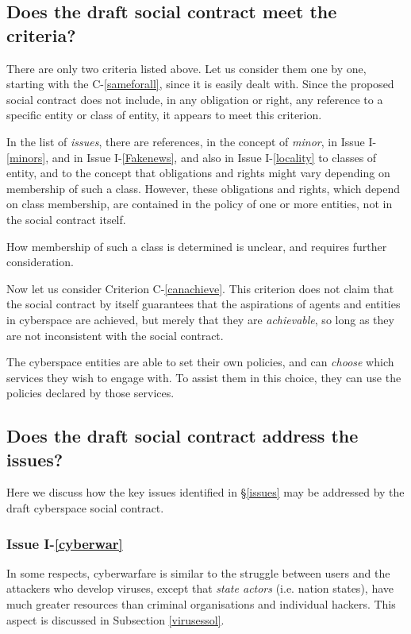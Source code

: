 \subsection{Does the draft social contract meet the criteria?}

There are only two criteria listed above. Let us consider them one by one, starting
with the C-\ref{sameforall}, since it is easily dealt with. Since the proposed social
contract does not include, in any obligation or right, any reference to a specific
entity or class of entity, it appears to meet this criterion.

In the list of {\em issues}, there are references,
in the concept of {\em minor}, in Issue I-\ref{minors}, and in Issue
I-\ref{Fakenews}, and also in Issue I-\ref{locality} to classes of entity, 
and to the concept that obligations and rights might vary depending on membership of such a class.
However, these obligations and rights, which depend on class membership, are contained
in the policy of one or more entities, not in the social contract itself.

How membership of such a class is determined is unclear, and requires further consideration.

Now let us consider Criterion C-\ref{canachieve}. This criterion does not claim that
the social contract by itself guarantees that the aspirations of agents
and entities in cyberspace are achieved, but merely that they are {\em achievable},
so long as they are not inconsistent with the social contract.

The cyberspace entities are able to set their own policies, and can {\em choose}
which services they wish to engage with. To assist them in this choice, they
can use the policies declared by those services.

\subsection{Does the draft social contract address the issues?}\label{address}

Here we discuss how the key issues identified in \S\ref{issues} may be addressed
by the draft cyberspace social contract.

\subsubsection*{Issue I-\ref{cyberwar}}\label{cyberwarsol}

In some respects, cyberwarfare is similar to the struggle between users and 
the attackers who develop viruses, except that {\em state actors} (i.e.
nation states), have much greater resources than criminal organisations and
individual hackers. This aspect is discussed in Subsection \ref{virusessol}.

